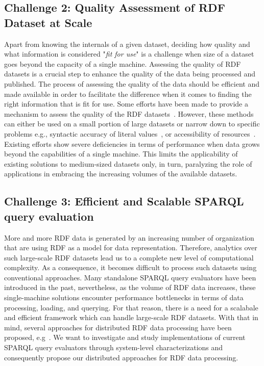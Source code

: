 \subsection{Challenge 2: Quality Assessment of RDF Dataset at Scale}
Apart from knowing the internals of a given dataset, deciding how quality and what information is considered "\textit{fit for use}" is a challenge when size of a dataset goes beyond the capacity of a single machine.
Assessing the quality of RDF datasets is a crucial step to enhance the quality of the data being processed and published.
The process of assessing the quality of the data should be efficient and made available in order to facilitate the difference when it comes to finding the right information that is fit for use.
Some efforts have been made to provide a mechanism to assess the quality of the RDF datasets~\cite{Debattista0AC18,farber2018,beek2018,debattista2016luzzu}.
However, these methods can either be used on a small portion of large datasets \cite{farber2018} or narrow down to specific problems e.g., syntactic accuracy of literal values~\cite{beek2018}, or accessibility of resources~\cite{Mihindukulasooriya2016LDSA}.
Existing efforts show severe deficiencies in terms of performance when data grows beyond the capabilities of a single machine.
This limits the applicability of existing solutions to medium-sized datasets only, in turn, paralyzing the role of applications in embracing the increasing volumes of the available datasets.

\subsection{Challenge 3: Efficient and Scalable SPARQL query evaluation}
More and more RDF data is generated by an increasing number of organization that are using RDF as a model for data representation.
Therefore, analytics over such large-scale RDF datasets lead us to a complete new level of computational complexity.
As a consequence, it becomes difficult to process such datasets using conventional approaches.
Many standalone SPARQL query evaluators have been introduced in the past, nevertheless, as the volume of RDF data increases, these single-machine solutions encounter performance bottlenecks in terms of data processing, loading, and querying.
For that reason, there is a need for a scalabale and efficient framework which can handle large-scale RDF datasets.
With that in mind, several approaches for distributed RDF data processing have been proposed, e.g~\cite{sparqlgx-iswc-2016, Schatzle:2016:SRQ:2977797.2977806}.
We want to investigate and study implementations of current SPARQL query evaluators through system-level characterizations and consequently propose our distributed approaches for RDF data processing.


